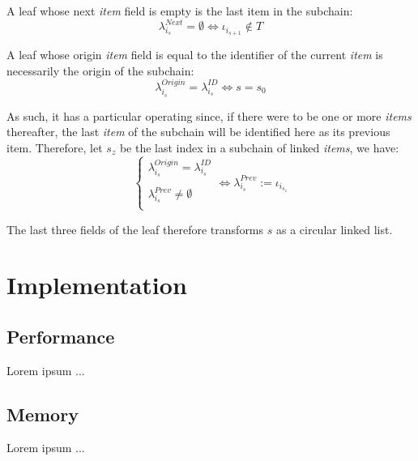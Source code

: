 \documentclass[twoside,twocolumn]{article}
\theoremstyle{definition}
\theoremstyle{remark}
\begin{document}
A leaf whose next \emph{item} field is empty is the last item in the subchain:
\begin{equation}
    \label{eq:lastItem}
    \lambda_{i_s}^{Next} = \emptyset \iff \iota_{i_{s+1}} \not\in T
\end{equation}

A leaf whose origin \emph{item} field is equal to the identifier of the current \emph{item} is necessarily the origin of the subchain:
\begin{equation}
    \label{eq:firstItem}
    \lambda_{i_s}^{Origin} = \lambda_{i_s}^{ID} \iff s = s_0
\end{equation}

As such, it has a particular operating since, if there were to be one or more \emph{items} thereafter, the last \emph{item} of the subchain will be 
identified here as its previous item. Therefore, let $s_z$ be the last index in a subchain of linked \emph{items}, we have:
\begin{equation}
    \label{eq:circularAtOrigin}
    \left\{
        \begin{array}{l}
            \lambda_{i_s}^{Origin} = \lambda_{i_s}^{ID} \\ \\
            \lambda_{i_s}^{Prev} \neq \emptyset \\
        \end{array}
    \right.
    \iff \lambda_{i_s}^{Prev} := \iota_{i_{s_z}}
\end{equation}

The last three fields of the leaf therefore transforms $s$ as a circular linked list.


\section{Implementation}

\subsection{Performance}

Lorem ipsum ...

\subsection{Memory}

Lorem ipsum ...
\end{document}
